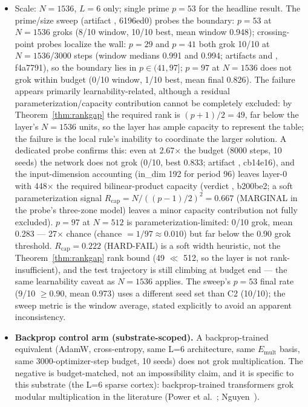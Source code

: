 \documentclass[11pt]{article}
\begin{document}
\begin{itemize}
\item Scale: $N=1536$, $L=6$ only; single prime $p=53$ for the headline result. The prime/size sweep (artifact \texttt{}, 6196ed0) probes the boundary: $p{=}53$ at $N{=}1536$ groks (8/10 window, 10/10 best, mean window 0.948); crossing-point probes localize the wall: $p{=}29$ and $p{=}41$ both grok 10/10 at $N{=}1536$/3000 steps (window medians 0.991 and 0.994; artifacts \texttt{} and \texttt{}, f4a7791), so the boundary lies in $p \in (41, 97]$; $p{=}97$ at $N{=}1536$ does not grok within budget (0/10 window, 1/10 best, mean final 0.826). The failure appears primarily learnability-related, although a residual parameterization/capacity contribution cannot be completely excluded: by Theorem~\ref{thm:rankgap} the required rank is $(p{+}1)/2{=}49$, far below the layer's $N{=}1536$ units, so the layer has ample capacity to represent the table; the failure is the local rule's inability to coordinate the larger solution. A dedicated probe confirms this: even at 2.67$\times$ the budget (8000 steps, 10 seeds) the network does not grok (0/10, best 0.833; artifact \texttt{}, cb14e16), and the input-dimension accounting (in\_dim 192 for period 96) leaves layer-0 with 448$\times$ the required bilinear-product capacity (verdict \texttt{}, b200be2; a soft parameterization signal $R_{\mathrm{cap}} = N/((p{-}1)/2)^2 = 0.667$ (MARGINAL in the probe's three-zone model) leaves a minor capacity contribution not fully excluded). $p{=}97$ at $N{=}512$ is parameterization-limited: 0/10 grok, mean 0.283 --- 27$\times$ chance (chance $= 1/97 \approx 0.010$) but far below the 0.90 grok threshold. $R_{\mathrm{cap}}{=}0.222$ (HARD-FAIL) is a soft width heuristic, not the Theorem~\ref{thm:rankgap} rank bound (49 $\ll$ 512, so the layer is not rank-insufficient), and the test trajectory is still climbing at budget end --- the same learnability caveat as $N{=}1536$ applies. The sweep's $p{=}53$ final rate (9/10 $\geq 0.90$, mean 0.973) uses a different seed set than C2 (10/10); the sweep metric is the window average, stated explicitly to avoid an apparent inconsistency.
\item \textbf{Backprop control arm (substrate-scoped).} A backprop-trained equivalent (AdamW, cross-entropy, same L=6 architecture, same $E_{\mathrm{mult}}$ basis, same 3000-optimizer-step budget, 10 seeds) does not grok multiplication. The negative is budget-matched, not an impossibility claim, and it is specific to this substrate (the L=6 sparse cortex): backprop-trained transformers grok modular multiplication in the literature (Power et al.~\cite{power2022}; Nguyen~\cite{nguyen2026}).

\end{itemize}
\end{document}

